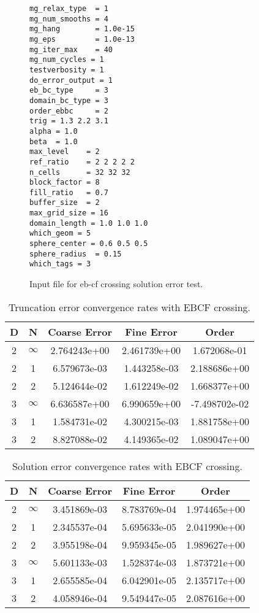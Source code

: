 \begin{figure}
\begin{tiny}
\begin{verbatim}
mg_relax_type  = 1
mg_num_smooths = 4
mg_hang        = 1.0e-15
mg_eps         = 1.0e-13
mg_iter_max    = 40
mg_num_cycles = 1
testverbosity = 1
do_error_output = 1
eb_bc_type     = 3
domain_bc_type = 3
order_ebbc     = 2
trig = 1.3 2.2 3.1
alpha = 1.0
beta  = 1.0
max_level    = 2
ref_ratio    = 2 2 2 2 2 
n_cells      = 32 32 32
block_factor = 8
fill_ratio   = 0.7
buffer_size  = 2
max_grid_size = 16
domain_length = 1.0 1.0 1.0
which_geom = 5
sphere_center = 0.6 0.5 0.5
sphere_radius  = 0.15	
which_tags = 3
\end{verbatim}
\end{tiny}
\caption{Input file for eb-cf crossing solution error test.}
\label{input4}
\end{figure}

\begin{table}
\begin{center}
\begin{tabular}{|c|c|c|c|c|} \hline
D & N &  Coarse Error & Fine Error & Order\\
\hline \hline 
2 & $\infty$ &  2.764243e+00 & 2.461739e+00 & 1.672068e-01 \\ 
2 & 1        & 6.579673e-03 & 1.443258e-03 & 2.188686e+00 \\ 
2 & 2        & 5.124644e-02 & 1.612249e-02 & 1.668377e+00 \\ 
3 & $\infty$ & 6.636587e+00 & 6.990659e+00 & -7.498702e-02 \\ 
3 & 1        & 1.584731e-02 & 4.300215e-03 & 1.881758e+00 \\ 
3 & 2        & 8.827088e-02 & 4.149365e-02 & 1.089047e+00 \\ 
\hline
\end{tabular}
\end{center}
\caption{Truncation error convergence rates with EBCF crossing.}
\label{results2}
\end{table}

\begin{table}
\begin{center}
\begin{tabular}{|c|c|c|c|c|} \hline
D & N &  Coarse Error & Fine Error & Order\\
\hline \hline 
2 & $\infty$ &    3.451869e-03 & 8.783769e-04 & 1.974465e+00 \\ 
2 & 1        &    2.345537e-04 & 5.695633e-05 & 2.041990e+00 \\ 
2 & 2        &    3.955198e-04 & 9.959345e-05 & 1.989627e+00 \\ 
3 & $\infty$ &    5.601133e-03 & 1.528374e-03 & 1.873721e+00 \\ 
3 & 1        &    2.655585e-04 & 6.042901e-05 & 2.135717e+00 \\ 
3 & 2        &    4.058946e-04 & 9.549447e-05 & 2.087616e+00 \\
\hline
\end{tabular}
\end{center}
\caption{Solution error convergence rates with EBCF crossing.}
\label{results4}
\end{table}


